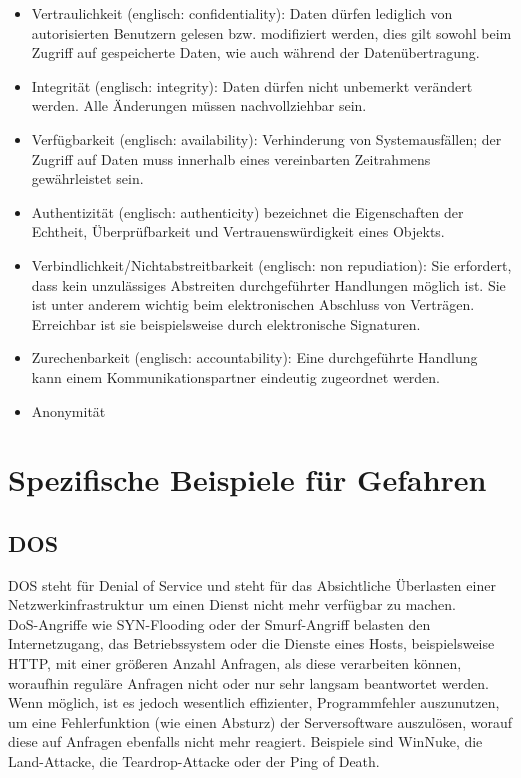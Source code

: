 \begin{itemize}
\item Vertraulichkeit (englisch: confidentiality): Daten dürfen lediglich von autorisierten Benutzern gelesen bzw. modifiziert werden, dies gilt sowohl beim Zugriff auf gespeicherte Daten, wie auch während der Datenübertragung.
\item Integrität (englisch: integrity): Daten dürfen nicht unbemerkt verändert werden. Alle Änderungen müssen nachvollziehbar sein.
\item Verfügbarkeit (englisch: availability): Verhinderung von Systemausfällen; der Zugriff auf Daten muss innerhalb eines vereinbarten Zeitrahmens gewährleistet sein.
\item Authentizität (englisch: authenticity) bezeichnet die Eigenschaften der Echtheit, Überprüfbarkeit und Vertrauenswürdigkeit eines Objekts.
\item Verbindlichkeit/Nichtabstreitbarkeit (englisch: non repudiation): Sie erfordert, dass kein unzulässiges Abstreiten durchgeführter Handlungen möglich ist. Sie ist unter anderem wichtig beim elektronischen Abschluss von Verträgen. Erreichbar ist sie beispielsweise durch elektronische Signaturen.
\item Zurechenbarkeit (englisch: accountability): Eine durchgeführte Handlung kann einem Kommunikationspartner eindeutig zugeordnet werden.
\item Anonymität
\end{itemize}

\section{Spezifische Beispiele für Gefahren}
\subsection{DOS}
DOS steht für Denial of Service und steht für das Absichtliche Überlasten einer Netzwerkinfrastruktur um einen Dienst nicht mehr verfügbar zu machen.\\
DoS-Angriffe wie SYN-Flooding oder der Smurf-Angriff belasten den Internetzugang, das Betriebssystem oder die Dienste eines Hosts, beispielsweise HTTP, mit einer größeren Anzahl Anfragen, als diese verarbeiten können, woraufhin reguläre Anfragen nicht oder nur sehr langsam beantwortet werden. Wenn möglich, ist es jedoch wesentlich effizienter, Programmfehler auszunutzen, um eine Fehlerfunktion (wie einen Absturz) der Serversoftware auszulösen, worauf diese auf Anfragen ebenfalls nicht mehr reagiert. Beispiele sind WinNuke, die Land-Attacke, die Teardrop-Attacke oder der Ping of Death.\\

